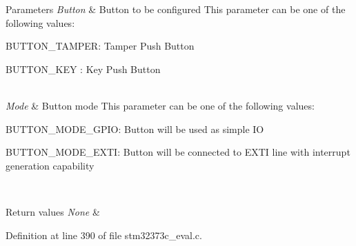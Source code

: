 \begin{DoxyParams}{Parameters}
{\em Button} & Button to be configured This parameter can be one of the following values\+: \begin{DoxyItemize}
\item B\+U\+T\+T\+O\+N\+\_\+\+T\+A\+M\+P\+ER\+: Tamper Push Button \item B\+U\+T\+T\+O\+N\+\_\+\+K\+EY \+: Key Push Button \end{DoxyItemize}
\\
\hline
{\em Mode} & Button mode This parameter can be one of the following values\+: \begin{DoxyItemize}
\item B\+U\+T\+T\+O\+N\+\_\+\+M\+O\+D\+E\+\_\+\+G\+P\+IO\+: Button will be used as simple IO \item B\+U\+T\+T\+O\+N\+\_\+\+M\+O\+D\+E\+\_\+\+E\+X\+TI\+: Button will be connected to E\+X\+TI line with interrupt generation capability \end{DoxyItemize}
\\
\hline
\end{DoxyParams}

\begin{DoxyRetVals}{Return values}
{\em None} & \\
\hline
\end{DoxyRetVals}


Definition at line 390 of file stm32373c\+\_\+eval.\+c.

